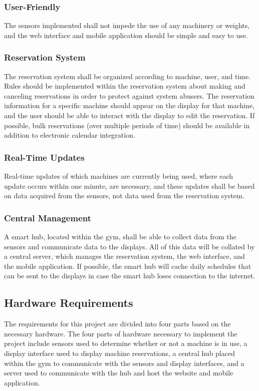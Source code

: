 \documentclass[PPFS.tex]{template/subfiles}
\begin{document}
\subsubsection{User-Friendly}
The sensors implemented shall not impede the use of any machinery or weights, and the web interface and mobile application should be simple and easy to use.

\subsubsection{Reservation System}
The reservation system shall be organized according to machine, user, and time. Rules should be implemented within the reservation system about making and canceling reservations in order to protect against system abusers. The reservation information for a specific machine should appear on the display for that machine, and the user should be able to interact with the display to edit the reservation. If possible, bulk reservations (over multiple periods of time) should be available in addition to electronic calendar integration.

\subsubsection{Real-Time Updates}
Real-time updates of which machines are currently being used, where each update occurs within one minute, are necessary, and these updates shall be based on data acquired from the sensors, not data used from the reservation system.

\subsubsection{Central Management}
A smart hub, located within the gym, shall be able to collect data from the sensors and communicate data to the displays. All of this data will be collated by a central server, which manages the reservation system, the web interface, and the mobile application. If possible, the smart hub will cache daily schedules that can be sent to the displays in case the smart hub loses connection to the internet.

\subsection{Hardware Requirements}
The requirements for this project are divided into four parts based on the necessary hardware. The four parts of hardware necessary to implement the project include sensors used to determine whether or not a machine is in use, a display interface used to display machine reservations, a central hub placed within the gym to communicate with the sensors and display interfaces, and a server used to communicate with the hub and host the website and mobile application.
\end{document}

